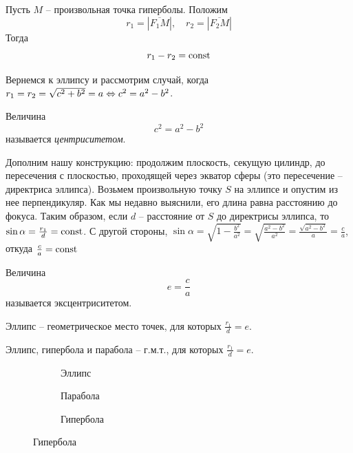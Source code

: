 \begin{Property}
	Пусть $M$ -- произвольная точка гиперболы. Положим
	\[r_1 = |\overline{F_1 M}|, \quad r_2 = |\overline{F_2 M}|\]
	Тогда
	\[r_1 - r_2 = \operatorname{const}\]

	\begin{figure}[H]
		\centering
		\def\svgwidth{.25\columnwidth}
		
	\end{figure}
\end{Property}

Вернемся к эллипсу и рассмотрим случай, когда $r_1 = r_2 = \sqrt{c^2 + b^2} = a \Leftrightarrow c^2 = a^2 - b^2$.

\begin{Def}
	Величина
	\[c^2 = a^2 - b^2\]
	называется \textit{центриситетом}.
\end{Def}

Дополним нашу конструкцию:
продолжим плоскость, секущую цилиндр, до пересечения с плоскостью, проходящей через экватор сферы (это пересечение -- директриса эллипса).
Возьмем произвольную точку $S$ на эллипсе и опустим из нее перпендикуляр. Как мы недавно выяснили, его длина равна расстоянию до фокуса.
Таким образом, если $d$ -- расстояние от $S$ до директрисы эллипса, то $\sin \alpha = \frac{r_1}{d} = \operatorname{const}$. С другой стороны,
$\sin \alpha = \sqrt{1 - \frac{b^2}{a^2}} = \sqrt{ \frac{a^2 - b^2}{a^2}} = \frac{\sqrt{a^2 - b^2}}{a} = \frac{c}{a}$, откуда $\frac{c}{a} = \operatorname{const}$ 

\begin{Def}
	Величина 
	\[e = \frac{c}{a}\]
	называется эксцентриситетом.
\end{Def}

\begin{Property}
	Эллипс -- геометрическое место точек, для которых $\frac{r_1}{d} = e$. 
\end{Property}

\begin{Rem}
	Эллипс, гипербола и парабола -- г.м.т., для которых $\frac{r_1}{d} = e$.

	\begin{figure}[H]
		\centering

		\begin{subfigure}[b]{.3\textwidth}
			\centering
			\def\svgwidth{\columnwidth}
			
			\caption{Эллипс}
		\end{subfigure}
		\hfill
		\begin{subfigure}[b]{.3\textwidth}
			\centering
			\def\svgwidth{.6\columnwidth}
			
			\caption{Парабола}
		\end{subfigure}
		\hfill
		\begin{subfigure}[b]{.3\textwidth}
			\centering
			\def\svgwidth{.8\columnwidth}
			
			\caption{Гипербола}
		\end{subfigure}
	\end{figure}
\end{Rem}

